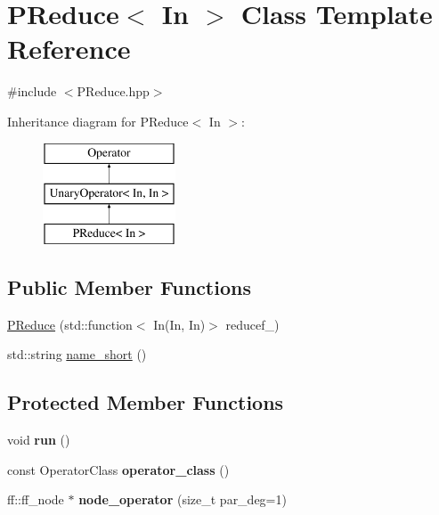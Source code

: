 \hypertarget{class_p_reduce}{\section{\-P\-Reduce$<$ \-In $>$ \-Class \-Template \-Reference}
\label{class_p_reduce}
}


{\ttfamily \#include $<$\-P\-Reduce.\-hpp$>$}

\-Inheritance diagram for \-P\-Reduce$<$ \-In $>$\-:\begin{figure}[H]
\begin{center}
\leavevmode
\includegraphics[height=3.000000cm]{class_p_reduce}
\end{center}
\end{figure}
\subsection*{\-Public \-Member \-Functions}
\begin{DoxyCompactItemize}
\item 
\hyperlink{class_p_reduce_a31e0899ba12232bd9d629281a145c219}{\-P\-Reduce} (std\-::function$<$ \-In(\-In, \-In)$>$ reducef\-\_\-)
\item 
std\-::string \hyperlink{class_p_reduce_aeec2fa6ffc97684cc42b6dda26d498d4}{name\-\_\-short} ()
\end{DoxyCompactItemize}
\subsection*{\-Protected \-Member \-Functions}
\begin{DoxyCompactItemize}
\item 
\hypertarget{class_p_reduce_a23d34226d830ba05591373ff0fb745b2}{void {\bfseries run} ()}\label{class_p_reduce_a23d34226d830ba05591373ff0fb745b2}

\item 
\hypertarget{class_p_reduce_af20857bc855fb223be6720efa12f0fb6}{const \-Operator\-Class {\bfseries operator\-\_\-class} ()}\label{class_p_reduce_af20857bc855fb223be6720efa12f0fb6}

\item 
\hypertarget{class_p_reduce_a0b795eb975c94cac8ef194324f0085f1}{ff\-::ff\-\_\-node $\ast$ {\bfseries node\-\_\-operator} (size\-\_\-t par\-\_\-deg=1)}\label{class_p_reduce_a0b795eb975c94cac8ef194324f0085f1}

\end{DoxyCompactItemize}
